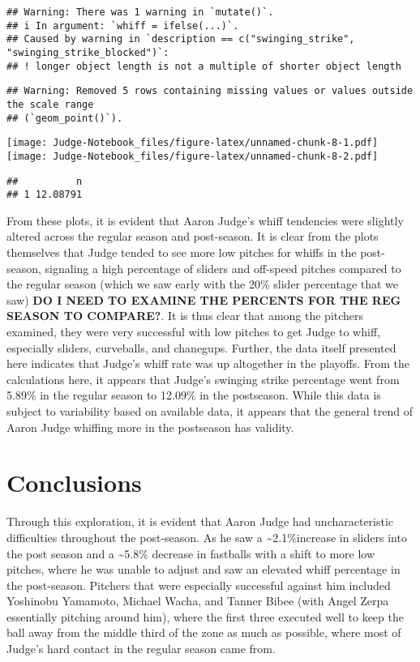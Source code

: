 \documentclass[
]{article}
\begin{document}
\begin{verbatim}
## Warning: There was 1 warning in `mutate()`.
## i In argument: `whiff = ifelse(...)`.
## Caused by warning in `description == c("swinging_strike", "swinging_strike_blocked")`:
## ! longer object length is not a multiple of shorter object length
\end{verbatim}

\begin{verbatim}
## Warning: Removed 5 rows containing missing values or values outside the scale range
## (`geom_point()`).
\end{verbatim}

\texttt{[image: Judge-Notebook\_files/figure-latex/unnamed-chunk-8-1.pdf]}
\texttt{[image: Judge-Notebook\_files/figure-latex/unnamed-chunk-8-2.pdf]}

\begin{verbatim}
##          n
## 1 12.08791
\end{verbatim}

From these plots, it is evident that Aaron Judge's whiff tendencies were
slightly altered across the regular season and post-season. It is clear
from the plots themselves that Judge tended to see more low pitches for
whiffs in the post-season, signaling a high percentage of sliders and
off-speed pitches compared to the regular season (which we saw early
with the 20\% slider percentage that we saw) \textbf{DO I NEED TO
EXAMINE THE PERCENTS FOR THE REG SEASON TO COMPARE?}. It is thus clear
that among the pitchers examined, they were very successful with low
pitches to get Judge to whiff, especially sliders, curveballs, and
chanegups. Further, the data itself presented here indicates that
Judge's whiff rate was up altogether in the playoffs. From the
calculations here, it appears that Judge's swinging strike percentage
went from 5.89\% in the regular season to 12.09\% in the postseason.
While this data is subject to variability based on available data, it
appears that the general trend of Aaron Judge whiffing more in the
postseason has validity.

\section{Conclusions}\label{conclusions}

Through this exploration, it is evident that Aaron Judge had
uncharacteristic difficulties throughout the post-season. As he saw a
\textasciitilde2.1\%increase in sliders into the post season and a
\textasciitilde5.8\% decrease in fastballs with a shift to more low
pitches, where he was unable to adjust and saw an elevated whiff
percentage in the post-season. Pitchers that were especially successful
against him included Yoshinobu Yamamoto, Michael Wacha, and Tanner Bibee
(with Angel Zerpa essentially pitching around him), where the first
three executed well to keep the ball away from the middle third of the
zone as much as possible, where most of Judge's hard contact in the
regular season came from.
\end{document}
